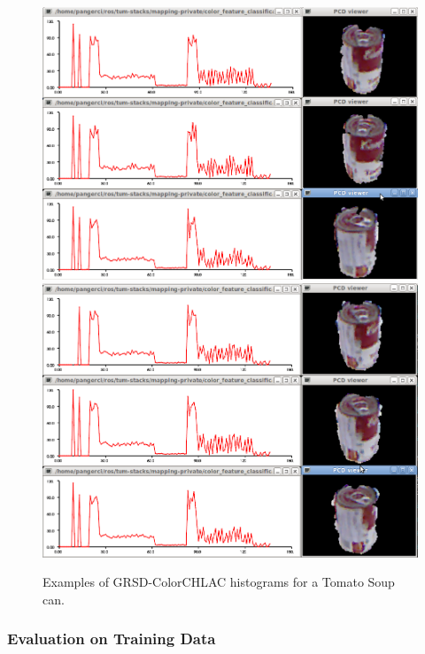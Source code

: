 \documentclass[conference]{sty/IEEEtran}
\begin{document}
\begin{figure}[htb!]
  \begin{center}
    \includegraphics[width=.9\columnwidth]{figures/colorCHLAC/real/tomato/tomato_hist_pcd.png}
    \includegraphics[width=.9\columnwidth]{figures/colorCHLAC/real/tomato/tomato_hist_pcd2.png}
    \caption{Examples of GRSD-ColorCHLAC histograms for a Tomato Soup can.}
    \label{fig:grsd_colorchlac_tomato}
  \end{center}
\end{figure}


\subsubsection{Evaluation on Training Data}
\end{document}
